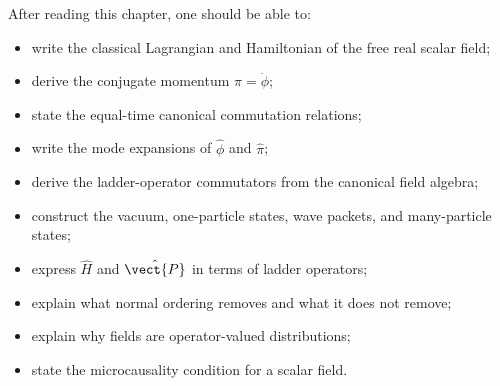After reading this chapter, one should be able to:
\begin{itemize}
    \item write the classical Lagrangian and Hamiltonian of the free real scalar
    field;
    \item derive the conjugate momentum \(\pi=\dot\phi\);
    \item state the equal-time canonical commutation relations;
    \item write the mode expansions of \(\hat\phi\) and \(\hat\pi\);
    \item derive the ladder-operator commutators from the canonical field
    algebra;
    \item construct the vacuum, one-particle states, wave packets, and
    many-particle states;
    \item express \(\hat H\) and \(\hat{\vect{P}}\) in terms of ladder
    operators;
    \item explain what normal ordering removes and what it does not remove;
    \item explain why fields are operator-valued distributions;
    \item state the microcausality condition for a scalar field.
\end{itemize}

